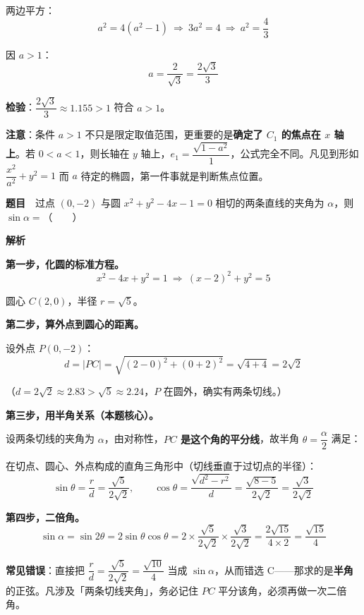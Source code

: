 两边平方：
\[a^{2}=4\left(a^{2}-1\right)\ \Longrightarrow\ 3a^{2}=4\ \Longrightarrow\ a^{2}=\frac43\]

因 $a>1$：
\[a=\frac2{\sqrt3}=\frac{2\sqrt3}3\]

\textbf{检验}：$\dfrac{2\sqrt3}3\approx1.155>1$  符合 $a>1$。


\begin{gktip}
\textbf{注意}：条件 $a>1$ 不只是限定取值范围，更重要的是\textbf{确定了 $C_1$ 的焦点在 $x$ 轴上}。若 $0<a<1$，则长轴在 $y$ 轴上，$e_1=\dfrac{\sqrt{1-a^{2}}}1$，公式完全不同。凡见到形如 $\dfrac{x^2}{a^2}+y^2=1$ 而 $a$ 待定的椭圆，第一件事就是判断焦点位置。
\end{gktip}

\par\medskip


\textbf{题目}　过点 $(0,-2)$ 与圆 $x^{2}+y^{2}-4x-1=0$ 相切的两条直线的夹角为 $\alpha$，则 $\sin\alpha=$（　　）

\textbf{解析}

\textbf{第一步，化圆的标准方程。}
\[x^{2}-4x+y^{2}=1\ \Longrightarrow\ (x-2)^{2}+y^{2}=5\]

圆心 $C(2,0)$，半径 $r=\sqrt5$。

\textbf{第二步，算外点到圆心的距离。}

设外点 $P(0,-2)$：
\[d=|PC|=\sqrt{(2-0)^{2}+(0+2)^{2}}=\sqrt{4+4}=2\sqrt2\]

（$d=2\sqrt2\approx2.83>\sqrt5\approx2.24$，$P$ 在圆外，确实有两条切线。）

\textbf{第三步，用半角关系（本题核心）。}

设两条切线的夹角为 $\alpha$，由对称性，\textbf{$PC$ 是这个角的平分线}，故半角 $\theta=\dfrac\alpha2$ 满足：

在切点、圆心、外点构成的直角三角形中（切线垂直于过切点的半径）：
\[\sin\theta=\frac rd=\frac{\sqrt5}{2\sqrt2},\qquad \cos\theta=\frac{\sqrt{d^{2}-r^{2}}}d=\frac{\sqrt{8-5}}{2\sqrt2}=\frac{\sqrt3}{2\sqrt2}\]

\textbf{第四步，二倍角。}
\[\sin\alpha=\sin2\theta=2\sin\theta\cos\theta=2\times\frac{\sqrt5}{2\sqrt2}\times\frac{\sqrt3}{2\sqrt2}=\frac{2\sqrt{15}}{4\times2}=\frac{\sqrt{15}}4\]


\begin{gktip}
\textbf{常见错误}：直接把 $\dfrac rd=\dfrac{\sqrt5}{2\sqrt2}=\dfrac{\sqrt{10}}4$ 当成 $\sin\alpha$，从而错选 C——那求的是\textbf{半角}的正弦。凡涉及「两条切线夹角」，务必记住 $PC$ 平分该角，必须再做一次二倍角。
\end{gktip}

